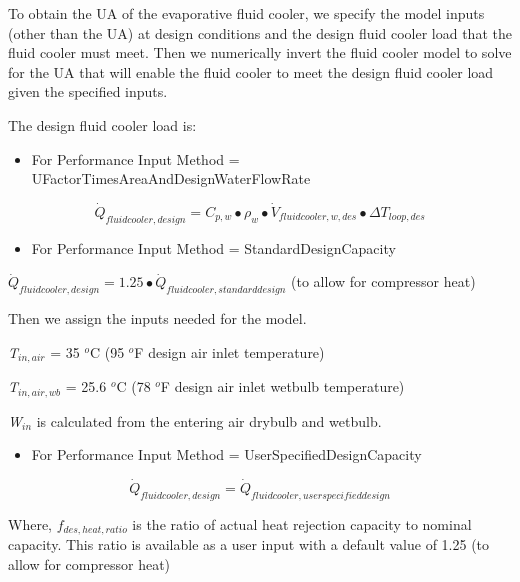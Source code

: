 To obtain the UA of the evaporative fluid cooler, we specify the model inputs (other than the UA) at design conditions and the design fluid cooler load that the fluid cooler must meet. Then we numerically invert the fluid cooler model to solve for the UA that will enable the fluid cooler to meet the design fluid cooler load given the specified inputs.

The design fluid cooler load is:

\begin{itemize}
\tightlist
\item
  For Performance Input Method = UFactorTimesAreaAndDesignWaterFlowRate
\end{itemize}

\begin{equation}
{\dot Q_{fluidcooler,design}} = {C_{p,w}} \bullet {\rho_w} \bullet {\dot V_{fluidcooler,w,des}} \bullet \Delta {T_{loop,des}}
\end{equation}

\begin{itemize}
\tightlist
\item
  For Performance Input Method = StandardDesignCapacity
\end{itemize}

\({\dot Q_{fluidcooler,design}} = 1.25 \bullet {\dot Q_{fluidcooler,standarddesign}}\) (to allow for compressor heat)

Then we assign the inputs needed for the model.

\emph{T\(_{in,air}\)} = 35 \(^{o}\)C (95 \(^{o}\)F design air inlet temperature)

\emph{T\(_{in,air,wb}\)} = 25.6 \(^{o}\)C (78 \(^{o}\)F design air inlet wetbulb temperature)

\emph{W\(_{in}\)} is calculated from the entering air drybulb and wetbulb.

\begin{itemize}
\tightlist
\item
  For Performance Input Method = UserSpecifiedDesignCapacity
\end{itemize}

\begin{equation}
{\dot Q_{fluidcooler,design}} = {\dot Q_{fluidcooler,userspecifieddesign}}
\end{equation}

Where, \({f_{des,heat,ratio}}\) is the ratio of actual heat rejection capacity to nominal capacity. This ratio is available as a user input with a default value of 1.25 (to allow for compressor heat)

